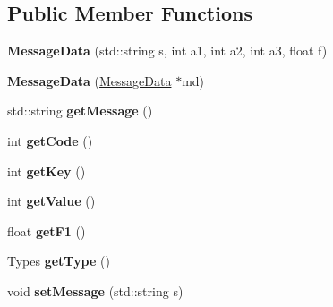 \subsection*{Public Member Functions}
\begin{DoxyCompactItemize}
\item 
\hypertarget{classosc_1_1MessageData_af370333b9828ad63ba1031ac941300c2}{{\bfseries Message\-Data} (std\-::string s, int a1, int a2, int a3, float f)}\label{classosc_1_1MessageData_af370333b9828ad63ba1031ac941300c2}

\item 
\hypertarget{classosc_1_1MessageData_acf5694351e2f877340d6b38044d8b2d3}{{\bfseries Message\-Data} (\hyperlink{classosc_1_1MessageData}{Message\-Data} $\ast$md)}\label{classosc_1_1MessageData_acf5694351e2f877340d6b38044d8b2d3}

\item 
\hypertarget{classosc_1_1MessageData_a8bf658a5be5789142fa260512fded9a1}{std\-::string {\bfseries get\-Message} ()}\label{classosc_1_1MessageData_a8bf658a5be5789142fa260512fded9a1}

\item 
\hypertarget{classosc_1_1MessageData_aa625a45bf78b8351d29a7696c8f014e9}{int {\bfseries get\-Code} ()}\label{classosc_1_1MessageData_aa625a45bf78b8351d29a7696c8f014e9}

\item 
\hypertarget{classosc_1_1MessageData_ab70773361a5ffba488a83b0d87cfb25c}{int {\bfseries get\-Key} ()}\label{classosc_1_1MessageData_ab70773361a5ffba488a83b0d87cfb25c}

\item 
\hypertarget{classosc_1_1MessageData_af79bf248fbb542bd25984f7f2b3993eb}{int {\bfseries get\-Value} ()}\label{classosc_1_1MessageData_af79bf248fbb542bd25984f7f2b3993eb}

\item 
\hypertarget{classosc_1_1MessageData_ad1e951e980e59c5d222b79856cae6d32}{float {\bfseries get\-F1} ()}\label{classosc_1_1MessageData_ad1e951e980e59c5d222b79856cae6d32}

\item 
\hypertarget{classosc_1_1MessageData_a38c69b7ebcf46e7c19ff2409af36a7ae}{Types {\bfseries get\-Type} ()}\label{classosc_1_1MessageData_a38c69b7ebcf46e7c19ff2409af36a7ae}

\item 
\hypertarget{classosc_1_1MessageData_a1da8f45a1453c7d11029fa360d7a642c}{void {\bfseries set\-Message} (std\-::string s)}\label{classosc_1_1MessageData_a1da8f45a1453c7d11029fa360d7a642c}


\end{DoxyCompactItemize}
